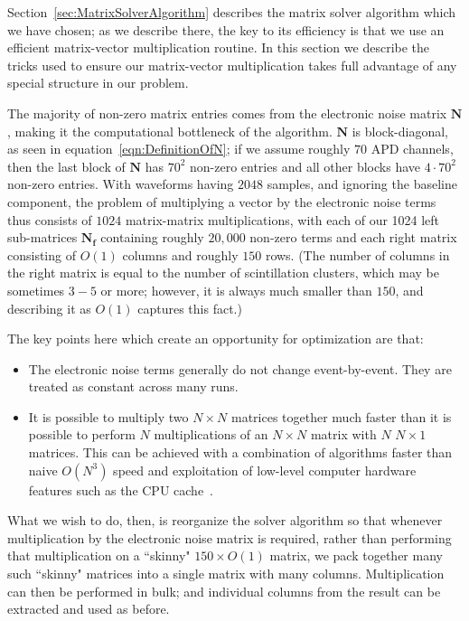 Section~\ref{sec:MatrixSolverAlgorithm} describes the matrix solver algorithm which we have chosen; as we describe there, the key to its efficiency is that we use an efficient matrix-vector multiplication routine.  In this section we describe the tricks used to ensure our matrix-vector multiplication takes full advantage of any special structure in our problem.

The majority of non-zero matrix entries comes from the electronic noise matrix $\mathbf{N}$, making it the computational bottleneck of the algorithm.  $\mathbf{N}$ is block-diagonal, as seen in equation~\ref{eqn:DefinitionOfN}; if we assume roughly $70$ APD channels, then the last block of $\mathbf{N}$ has $70^2$ non-zero entries and all other blocks have $4\cdot 70^2$ non-zero entries.  With waveforms having $2048$ samples, and ignoring the baseline component, the problem of multiplying a vector by the electronic noise terms thus consists of $1024$ matrix-matrix multiplications, with each of our 1024 left sub-matrices $\mathbf{N_f}$ containing roughly $20,000$ non-zero terms and each right matrix consisting of $O(1)$ columns and roughly $150$ rows.  (The number of columns in the right matrix is equal to the number of scintillation clusters, which may be sometimes $3-5$ or more; however, it is always much smaller than $150$, and describing it as $O(1)$ captures this fact.)

The key points here which create an opportunity for optimization are that:
\begin{itemize}
\item The electronic noise terms generally do not change event-by-event.  They are treated as constant across many runs.
\item It is possible to multiply two $N \times N$ matrices together much faster than it is possible to perform $N$ multiplications of an $N \times N$ matrix with $N$ $N \times 1$ matrices.  This can be achieved with a combination of algorithms faster than naive $O(N^3)$ speed and exploitation of low-level computer hardware features such as the CPU cache~\cite{BLASFirstReference,AnatomyOfMatrixMultiply}.
\end{itemize}
What we wish to do, then, is reorganize the solver algorithm so that whenever multiplication by the electronic noise matrix is required, rather than performing that multiplication on a ``skinny" $150 \times O(1)$ matrix, we pack together many such ``skinny" matrices into a single matrix with many columns.  Multiplication can then be performed in bulk; and individual columns from the result can be extracted and used as before.

